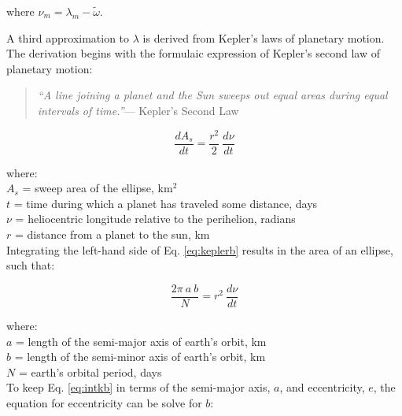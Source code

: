 \noindent where $\nu_m = \lambda_m - \tilde{\omega}$. 

A third approximation to $\lambda$ is derived from Kepler's laws of planetary motion. 
The derivation begins with the formulaic expression of Kepler's second law of planetary motion:

\begin{quote}
	\textit{``A line joining a planet and the Sun sweeps out equal areas during equal intervals of time.''}--- Kepler's Second Law
\end{quote}

\begin{equation}
\label{eq:keplerb}
	\frac{dA_s}{dt} = \frac{r^2}{2} \: \frac{d\nu}{dt}
\end{equation} 

\noindent where:\\
\indent $A_s$ = sweep area of the ellipse, km$^{2}$ \\
\indent $t$ = time during which a planet has traveled some distance, days\\
\indent $\nu$ = heliocentric longitude relative to the perihelion, radians \\
\indent $r$ = distance from a planet to the sun, km \\

Integrating the left-hand side of Eq. \ref{eq:keplerb} results in the area of an ellipse, such that:

\begin{equation}
\label{eq:intkb}
	\frac{2\pi \: a \: b}{N} = r^2\:\frac{d\nu}{dt}
\end{equation} 

\noindent where:\\
\indent $a$ = length of the semi-major axis of earth's orbit, km \\
\indent $b$ = length of the semi-minor axis of earth's orbit, km \\
\indent $N$ = earth's orbital period, days\\

To keep Eq. \ref{eq:intkb} in terms of the semi-major axis, $a$, and eccentricity, $e$, the equation for eccentricity can be solve for $b$:

